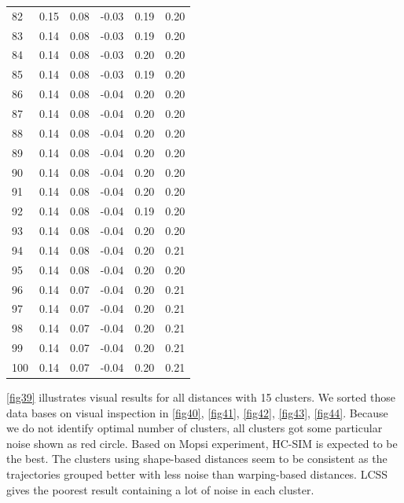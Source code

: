 \documentclass[a4paper, 12pt]{article}
\begin{document}
\begin{tabularx}{\linewidth}{|X|X|X|X|X|X|}
    82 & 0.15 & 0.08 & -0.03 & 0.19 & 0.20 \\
    83 & 0.14 & 0.08 & -0.03 & 0.19 & 0.20 \\
    84 & 0.14 & 0.08 & -0.03 & 0.20 & 0.20 \\
    85 & 0.14 & 0.08 & -0.03 & 0.19 & 0.20 \\
    86 & 0.14 & 0.08 & -0.04 & 0.20 & 0.20 \\
    87 & 0.14 & 0.08 & -0.04 & 0.20 & 0.20 \\
    88 & 0.14 & 0.08 & -0.04 & 0.20 & 0.20 \\
    89 & 0.14 & 0.08 & -0.04 & 0.20 & 0.20 \\
    90 & 0.14 & 0.08 & -0.04 & 0.20 & 0.20 \\
    91 & 0.14 & 0.08 & -0.04 & 0.20 & 0.20 \\
    92 & 0.14 & 0.08 & -0.04 & 0.19 & 0.20 \\
    93 & 0.14 & 0.08 & -0.04 & 0.20 & 0.20 \\
    94 & 0.14 & 0.08 & -0.04 & 0.20 & 0.21 \\
    95 & 0.14 & 0.08 & -0.04 & 0.20 & 0.20 \\
    96 & 0.14 & 0.07 & -0.04 & 0.20 & 0.21 \\
    97 & 0.14 & 0.07 & -0.04 & 0.20 & 0.21 \\
    98 & 0.14 & 0.07 & -0.04 & 0.20 & 0.21 \\
    99 & 0.14 & 0.07 & -0.04 & 0.20 & 0.21 \\
    100 & 0.14 & 0.07 & -0.04 & 0.20 & 0.21 
    \label{table:caltrain_silhouette}
\end{tabularx}

\autoref{fig39} illustrates visual results for all distances with 15 clusters. We sorted those data bases on visual inspection in \autoref{fig40}, \ref{fig41}, \ref{fig42}, \ref{fig43}, \ref{fig44}. Because we do not identify optimal number of clusters, all clusters got some particular noise shown as red circle. Based on Mopsi experiment, HC-SIM is expected to be the best. The clusters using shape-based distances seem to be consistent as the trajectories grouped better with less noise than warping-based distances. LCSS gives the poorest result containing a lot of noise in each cluster.
\end{document}
